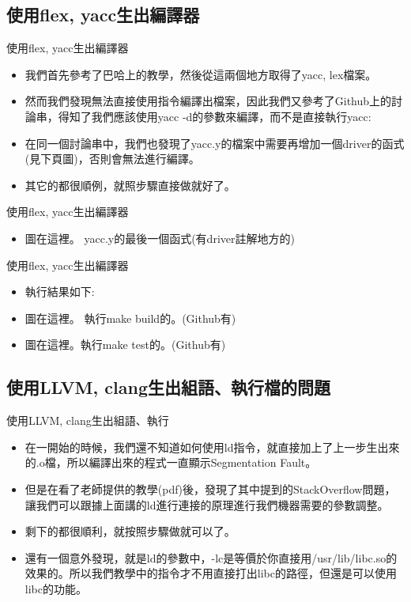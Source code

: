 \documentclass{beamer}
\begin{document}
\subsection{使用flex, yacc生出編譯器}
\begin{frame}{使用flex, yacc生出編譯器}
\begin{itemize}
    \item 我們首先參考了巴哈上的教學\cite{Lex}，然後從這兩個地方\cite{ANSILex, ANSIYacc}取得了yacc, lex檔案。
    \item 然而我們發現無法直接使用指令編譯出檔案，因此我們又參考了Github上的討論串\cite{C99Grammars}，得知了我們應該使用yacc -d的參數來編譯，而不是直接執行yacc: 
    \item 在同一個討論串中，我們也發現了yacc.y的檔案中需要再增加一個driver的函式(見下頁圖)，否則會無法進行編譯。
    \item 其它的都很順例，就照步驟直接做就好了。
\end{itemize}
\end{frame}

\begin{frame}{使用flex, yacc生出編譯器}
\begin{itemize}
    \item 
    圖在這裡。 yacc.y的最後一個函式(有driver註解地方的)
\end{itemize}
\end{frame}

\begin{frame}{使用flex, yacc生出編譯器}
\begin{itemize}
    \item 執行結果如下:
    \item 
    圖在這裡。 執行make build的。(Github有)
    \item
    圖在這裡。執行make test的。(Github有)
\end{itemize}
\end{frame}
\subsection{使用LLVM, clang生出組語、執行檔的問題}
\begin{frame}{使用LLVM, clang生出組語、執行}
\begin{itemize}
    \item 在一開始的時候，我們還不知道如何使用ld指令，就直接加上了上一步生出來的.o檔，所以編譯出來的程式一直顯示Segmentation Fault。
    \item 但是在看了老師提供的教學(pdf)後，發現了其中提到的StackOverflow問題\cite{GccOverflow}，讓我們可以跟據上面講的ld進行連接的原理進行我們機器需要的參數調整。
    \item 剩下的都很順利，就按照步驟做就可以了。
    \item 還有一個意外發現，就是ld的參數中，-lc是等價於你直接用/usr/lib/libc.so的效果的。所以我們教學中的指令才不用直接打出libc的路徑，但還是可以使用libc的功能。
\end{itemize}
    
\end{frame}
\end{document}
